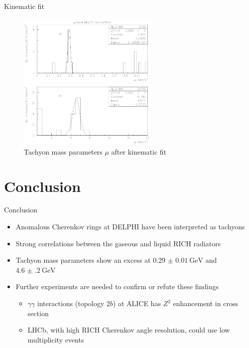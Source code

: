 \documentclass{beamer}
\begin{document}
\begin{frame}{Kinematic fit}
  \begin{figure}
    \centering
    \includegraphics[width = 0.6\textwidth]{ConstrainedMassParameters.png}
    \caption{Tachyon mass parameters $\mu$ after kinematic fit}
  \end{figure}
\end{frame}

\section{Conclusion}
\begin{frame}{Conclusion}
  \begin{itemize}
    \item{Anomalous Cherenkov rings at DELPHI have been interpreted as tachyons}
    \item{Strong correlations between the gaseous and liquid RICH radiators}
    \item{Tachyon mass parameters show an excess at $\SI{0.29(1)}{\giga\eV}$ and $\SI{4.6(2)}{\giga\eV}$}
    \item{Further experiments are needed to confirm or refute these findings}
    \begin{itemize}
      \item{$\gamma\gamma$ interactions (topology $2b$) at ALICE has $Z^2$ enhancement in cross section}
      \item{LHCb, with high RICH Cherenkov angle resolution, could use low multiplicity events}
    \end{itemize}
  \end{itemize}
\end{frame}
\end{document}
